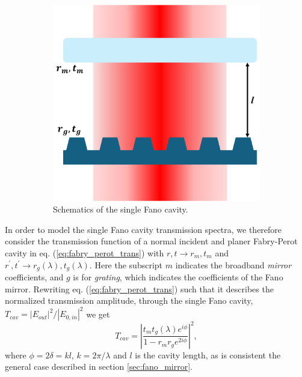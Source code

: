 \begin{figure}[h!]
\begin{subfigure}[b]{0.3\textwidth}
        \includegraphics[width=\textwidth]{figures/single_fano_sketch.pdf}
        \caption{Schematics of the single Fano cavity.}
        \label{fig:single_fano_sketch}
    \end{subfigure}
    \caption{}
    \label{fig:broadband_and_single_fano_sketch}
\end{figure}

In order to model the single Fano cavity transmission spectra, we therefore consider the transmission function of a normal incident and planer Fabry-Perot cavity in eq. (\ref{eq:fabry_perot_trans}) with $r,t \rightarrow r_m,t_m$ and $r^{\prime},t^{\prime} \rightarrow r_g(\lambda),t_g(\lambda)$. Here the subscript $m$ indicates the broadband \emph{mirror} coefficients, and $g$ is for \emph{grating}, which indicates the coefficients of the Fano mirror. Rewriting eq. (\ref{eq:fabry_perot_trans}) such that it describes the normalized transmission amplitude, through the single Fano cavity, $T_{cav} = |E_{out}|^2/|E_{0,in}|^2$ we get
\begin{equation}
    T_{cav} = \left|\frac{t_m t_g(\lambda) e^{i\phi}}{1 - r_m r_g e^{2i\phi}}\right|^2,
    \label{eq:single_fano_trans}
\end{equation}
where $\phi = 2\delta = kl$, $k=2 \pi / \lambda$ and $l$ is the cavity length, as is consistent the general case described in section \ref{sec:fano_mirror}.


